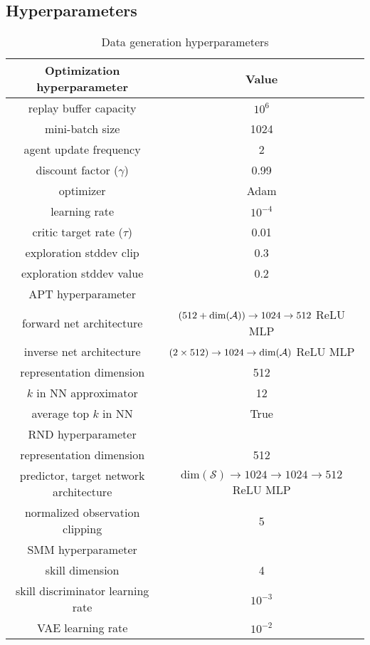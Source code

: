 \subsection{Hyperparameters}

\begin{table}[ht]
    \centering
    \begin{tabular}{|c|c|}
        \hline
        Optimization hyperparameter & Value \\
        \hline
        replay buffer capacity & $10^6$ \\
        mini-batch size & 1024 \\
        agent update frequency & 2 \\
        discount factor ($\gamma$) & 0.99 \\
        optimizer & Adam \\
        learning rate & $10^{-4}$ \\
        critic target rate ($\tau$) & 0.01 \\
        exploration stddev clip & 0.3 \\
        exploration stddev value & 0.2 \\
        \hline
        APT hyperparameter & \\
        \hline
        forward net architecture & $(512 + \text{dim}(\mathcal{A})) \rightarrow 1024 \rightarrow 512$ ReLU MLP \\
        inverse net architecture & $(2 \times 512) \rightarrow 1024 \rightarrow \text{dim}(\mathcal{A})$ ReLU MLP \\
        representation dimension & 512 \\
        $k$ in NN approximator & 12 \\
        average top $k$ in NN & True \\
        \hline
        RND hyperparameter & \\
        \hline
        representation dimension & 512 \\
        predictor, target network architecture & $\text{dim}(\mathcal{S}) \rightarrow 1024 \rightarrow 1024 \rightarrow 512$ ReLU MLP \\
        normalized observation clipping & 5 \\
        \hline
        SMM hyperparameter & \\
        \hline
        skill dimension & 4 \\
        skill discriminator learning rate & $10^{-3}$ \\
        VAE learning rate & $10^{-2}$ \\
        \hline
    \end{tabular}
    \caption{Data generation hyperparameters}
    \label{tab:data_gen_hyperparams}
\end{table}



